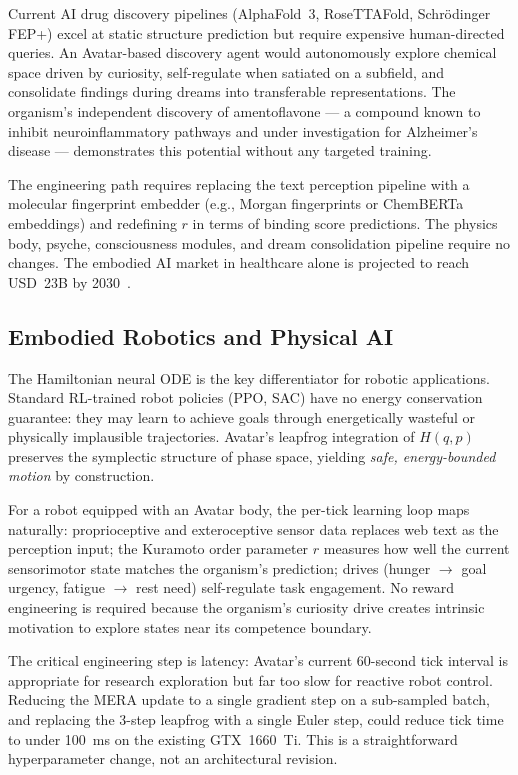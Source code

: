 \documentclass[12pt,a4paper]{article}
\begin{document}
Current AI drug discovery pipelines (AlphaFold~3, RoseTTAFold, Schr\"{o}dinger FEP+)
excel at static structure prediction but require expensive human-directed queries. An
Avatar-based discovery agent would autonomously explore chemical space driven by
curiosity, self-regulate when satiated on a subfield, and consolidate findings during
dreams into transferable representations. The organism's independent discovery of
amentoflavone --- a compound known to inhibit neuroinflammatory pathways and under
investigation for Alzheimer's disease --- demonstrates this potential without any
targeted training.

The engineering path requires replacing the text perception pipeline with a molecular
fingerprint embedder (e.g., Morgan fingerprints or ChemBERTa embeddings) and redefining
$r$ in terms of binding score predictions. The physics body, psyche, consciousness
modules, and dream consolidation pipeline require no changes. The embodied AI market in
healthcare alone is projected to reach USD~23B by 2030~\cite{marketembodied2025}.

\subsection{Embodied Robotics and Physical AI}

The Hamiltonian neural ODE is the key differentiator for robotic applications. Standard
RL-trained robot policies (PPO, SAC) have no energy conservation guarantee: they may
learn to achieve goals through energetically wasteful or physically implausible
trajectories. Avatar's leapfrog integration of $H(q,p)$ preserves the symplectic
structure of phase space, yielding \emph{safe, energy-bounded motion} by construction.

For a robot equipped with an Avatar body, the per-tick learning loop maps naturally:
proprioceptive and exteroceptive sensor data replaces web text as the perception input;
the Kuramoto order parameter $r$ measures how well the current sensorimotor state
matches the organism's prediction; drives (hunger $\to$ goal urgency, fatigue $\to$ rest
need) self-regulate task engagement. No reward engineering is required because the
organism's curiosity drive creates intrinsic motivation to explore states near its
competence boundary.

The critical engineering step is latency: Avatar's current 60-second tick interval is
appropriate for research exploration but far too slow for reactive robot control. Reducing
the MERA update to a single gradient step on a sub-sampled batch, and replacing the 3-step
leapfrog with a single Euler step, could reduce tick time to under 100~ms on the existing
GTX~1660~Ti. This is a straightforward hyperparameter change, not an architectural revision.
\end{document}
